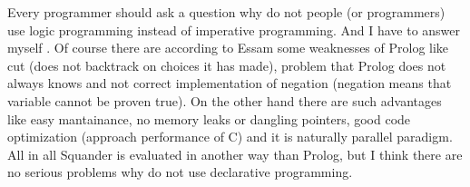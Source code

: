\documentclass[11pt,twoside,a4paper]{book}
\begin{document}
Every programmer should ask a question why do not people (or programmers)
use logic programming instead of imperative programming. And I have to answer
myself . Of course there are according to Essam
\cite{essam:cla} some weaknesses of Prolog like cut (does not backtrack on
choices it has made), problem that Prolog does not always knows 
and not correct implementation of negation (negation means that variable cannot
be proven true). On the other hand there are such advantages like easy mantainance,
no memory leaks or dangling pointers, good code optimization (approach
performance of C) and it is naturally parallel paradigm. All in all Squander is
evaluated in another way than Prolog, but I think there are no serious problems
why do not use declarative programming.


\end{document}
